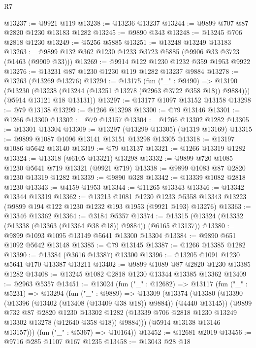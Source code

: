 \begin{lexlean}{R7}
\begin{coremodule}
@13237 := @9921 @119
@13238 := @13236 @13237
@13244 := @9899 @707 @87 @2820 @1230 @13183 @1282
@13245 := @9890 @343
@13248 := @13245 @706 @2818 @1230
@13249 := @5256 @5885
@13251 := @13248 @13249 @13183
@13263 := @9899 @132 @362 @1230 @1233 @3723 @5885 (@9906 @33 @3723 (@1463 (@9909 @33)))
@13269 := @9914 @122 @1230 @1232 @359 @1953 @9922
@13276 := @13231 @87 @1230 @1230 @119 @1282 @13237 @9884
@13278 := @13263 (@13269 @13276)
@13294 := @13175
    (fun ("_" : @9490) =>
    @13190
      (@13230 (@13238 (@13244 (@13251 @13278 (@2963 @3722 @358 @18)) @9884)))
      (@5914 @13121 @18 @13131))
@13297 := @13177 @1097 @13152 @13158
@13298 := @79 @13138
@13299 := @1266 @13298
@13300 := @79 @13146
@13301 := @1266 @13300
@13302 := @79 @13157
@13304 := @1266 @13302 @1282
@13305 := @13301 @13304
@13309 := @13297 (@13299 @13305) (@1319 @13169)
@13315 := @9899 @1087 @1096 @13141 @13151 @13298 @13305
@13318 := @13197 @1086 @5642 @13140
@13319 := @79 @13137
@13321 := @1266 @13319 @1282
@13324 := @13318 (@6105 @13321) @13298
@13332 := @9899 @720 @1085 @1230 @5641 @719 @13321 (@9921 @719)
@13338 := @9899 @1083 @87 @2820 @1230 @13319 @1282
@13339 := @9890 @328
@13342 := @13339 @1082 @2818 @1230
@13343 := @4159 @1953
@13344 := @11265 @13343
@13346 := @13342 @13344 @13319
@13362 := @13213
    @1081
    @1230
    @1233
    @5358
    @13343
    @13223
    (@9899 @194 @122 @1230 @1232 @193 @1953 (@9921 @193) @13276)
@13363 := @13346 @13362
@13364 := @3184 @5357
@13374 := @13315 (@13324 (@13332 (@13338 (@13363 (@13364 @38 @18)) @9884)) (@6165 @13137))
@13380 := @9899 @1093 @1095 @13149 @5641 @13300 @13304
@13384 := @9890 @651 @1092 @5642 @13148
@13385 := @79 @13145
@13387 := @1266 @13385 @1282
@13390 := @13384 (@3616 @13387) @13300
@13396 := @13205 @1091 @1230 @5641 @170 @13387 @13211
@13402 := @9899 @1089 @87 @2820 @1230 @13385 @1282
@13408 := @13245 @1082 @2818 @1230 @13344 @13385 @13362
@13409 := @2963 @5357
@13451 := @13024
    (fun ("_" : @12682) =>
    @13117
      (fun ("_" : @5231) =>
      @13294
        (fun ("_" : @9889) =>
        @13309
          (@13374
            (@13380
              (@13390 (@13396 (@13402 (@13408 (@13409 @38 @18)) @9884)) (@4440 @13145))
              (@9899
                @732
                @87
                @2820
                @1230
                @13302
                @1282
                (@13339 @706 @2818 @1230 @13249 @13302 @13278 (@12640 @358 @18))
                @9884)))
          (@5914 @13138 @13146 @13157)))
      (fun ("_" : @5367) => @10164))
@13452 := @12681 @2019
@13456 := @9716 @285 @1107 @167 @1235
@13458 := @13043 @28 @18

\end{coremodule}
\end{lexlean}
